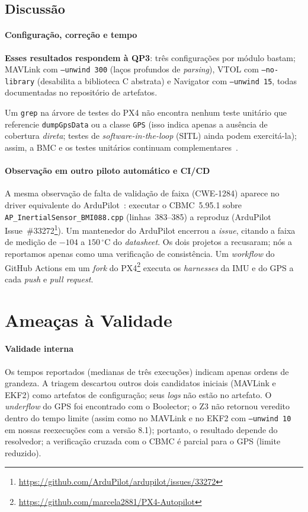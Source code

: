 \documentclass[conference]{IEEEtran}
\begin{document}
\subsection{Discussão}
\label{subsec:discussion}

\paragraph{Configuração, correção e tempo}
\begin{rqbox}
\textbf{Esses resultados respondem à QP3}: três configurações por
módulo bastam; MAVLink com \texttt{--unwind~300} (laços profundos de
\textit{parsing}), VTOL com \texttt{--no-library} (desabilita a
biblioteca C abstrata) e Navigator com \texttt{--unwind~15}, todas
documentadas no repositório de artefatos.
\end{rqbox}
Um \texttt{grep} na árvore de testes do PX4 não encontra nenhum teste
unitário que referencie \texttt{dumpGpsData} ou a classe \texttt{GPS}
(isso indica apenas a ausência de cobertura \emph{direta}; testes de
\textit{software-in-the-loop} (SITL) ainda podem exercitá-la); assim,
a BMC e os testes unitários continuam
complementares~\cite{Godefroid2005,Khatiri2024}.

\paragraph{Observação em outro piloto automático e CI/CD}
A mesma observação de falta de validação de faixa (CWE-1284) aparece
no driver equivalente do ArduPilot~\cite{ArduPilot}: executar o
CBMC~5.95.1 sobre \texttt{AP\_InertialSensor\_BMI088.cpp}
(linhas~383--385) a reproduz (ArduPilot
Issue~\#33272\footnote{\url{https://github.com/ArduPilot/ardupilot/issues/33272}}).
Um mantenedor do ArduPilot encerrou a \textit{issue}, citando a faixa
de medição de $-104$ a $150\,^\circ$C do \textit{datasheet}. Os dois
projetos a recusaram; nós a reportamos apenas como uma verificação de
consistência.
Um \textit{workflow} do GitHub Actions em um \textit{fork} do
PX4\footnote{\url{https://github.com/marcela2881/PX4-Autopilot}}
executa os \textit{harnesses} da IMU e do GPS a cada \textit{push} e
\textit{pull request}.

\section{Ameaças à Validade}
\label{sec:threats}

\paragraph{Validade interna}
Os tempos reportados (medianas de três execuções) indicam apenas
ordens de grandeza.
A triagem descartou outros dois candidatos iniciais (MAVLink e EKF2)
como artefatos de configuração; seus \textit{logs} não estão no
artefato. O \textit{underflow} do GPS foi encontrado com o Boolector;
o Z3 não retornou veredito dentro do tempo limite (assim como no
MAVLink e no EKF2 com \texttt{--unwind~10} em nossas reexecuções com
a versão 8.1); portanto, o resultado depende do resolvedor; a
verificação cruzada com o CBMC é parcial para o GPS (limite
reduzido).
\end{document}
